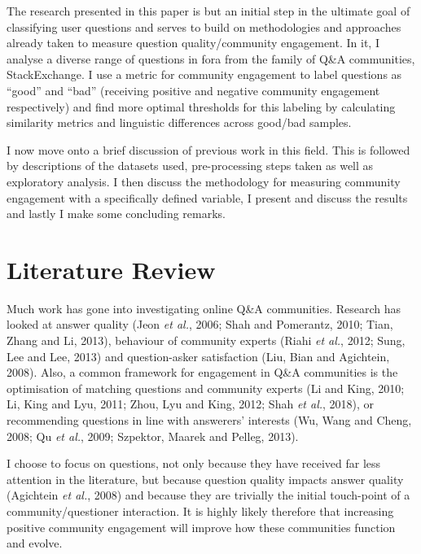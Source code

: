 \documentclass[11pt,preprint, authoryear]{article}
\numberwithin{equation}{section}
\numberwithin{figure}{section}
\numberwithin{table}{section}
\begin{document}
\newpage

The research presented in this paper is but an initial step in the
ultimate goal of classifying user questions and serves to build on
methodologies and approaches already taken to measure question
quality/community engagement. In it, I analyse a diverse range of
questions in fora from the family of Q\&A communities, StackExchange. I
use a metric for community engagement to label questions as ``good'' and
``bad'' (receiving positive and negative community engagement
respectively) and find more optimal thresholds for this labeling by
calculating similarity metrics and linguistic differences across
good/bad samples.

I now move onto a brief discussion of previous work in this field. This
is followed by descriptions of the datasets used, pre-processing steps
taken as well as exploratory analysis. I then discuss the methodology
for measuring community engagement with a specifically defined variable,
I present and discuss the results and lastly I make some concluding
remarks.

\newpage

\section{\texorpdfstring{Literature Review
\label{Lit}}{Literature Review }}\label{literature-review}

Much work has gone into investigating online Q\&A communities. Research
has looked at answer quality (Jeon \emph{et al.}, 2006; Shah and
Pomerantz, 2010; Tian, Zhang and Li, 2013), behaviour of community
experts (Riahi \emph{et al.}, 2012; Sung, Lee and Lee, 2013) and
question-asker satisfaction (Liu, Bian and Agichtein, 2008). Also, a
common framework for engagement in Q\&A communities is the optimisation
of matching questions and community experts (Li and King, 2010; Li, King
and Lyu, 2011; Zhou, Lyu and King, 2012; Shah \emph{et al.}, 2018), or
recommending questions in line with answerers' interests (Wu, Wang and
Cheng, 2008; Qu \emph{et al.}, 2009; Szpektor, Maarek and Pelleg, 2013).

I choose to focus on questions, not only because they have received far
less attention in the literature, but because question quality impacts
answer quality (Agichtein \emph{et al.}, 2008) and because they are
trivially the initial touch-point of a community/questioner interaction.
It is highly likely therefore that increasing positive community
engagement will improve how these communities function and evolve.
\end{document}
